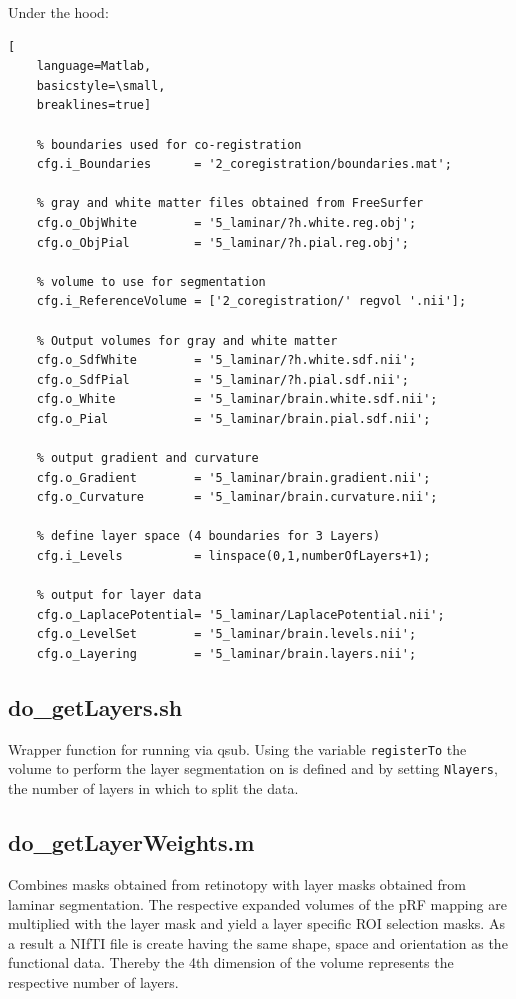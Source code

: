 \documentclass[12pt,a4paper]{scrartcl}
\begin{document}
\noindent Under the hood:
\begin{lstlisting}[
    language=Matlab,
    basicstyle=\small,
    breaklines=true]

    % boundaries used for co-registration
    cfg.i_Boundaries      = '2_coregistration/boundaries.mat';

    % gray and white matter files obtained from FreeSurfer
    cfg.o_ObjWhite        = '5_laminar/?h.white.reg.obj';
    cfg.o_ObjPial         = '5_laminar/?h.pial.reg.obj';

    % volume to use for segmentation
    cfg.i_ReferenceVolume = ['2_coregistration/' regvol '.nii'];

    % Output volumes for gray and white matter
    cfg.o_SdfWhite        = '5_laminar/?h.white.sdf.nii';
    cfg.o_SdfPial         = '5_laminar/?h.pial.sdf.nii';
    cfg.o_White           = '5_laminar/brain.white.sdf.nii';
    cfg.o_Pial            = '5_laminar/brain.pial.sdf.nii';

    % output gradient and curvature
    cfg.o_Gradient        = '5_laminar/brain.gradient.nii';
    cfg.o_Curvature       = '5_laminar/brain.curvature.nii';

    % define layer space (4 boundaries for 3 Layers)
    cfg.i_Levels          = linspace(0,1,numberOfLayers+1);

    % output for layer data
    cfg.o_LaplacePotential= '5_laminar/LaplacePotential.nii';
    cfg.o_LevelSet        = '5_laminar/brain.levels.nii';
    cfg.o_Layering        = '5_laminar/brain.layers.nii';
\end{lstlisting}

\subsection{do\_getLayers.sh}
\label{sh:getLyr}
Wrapper function for running \texttt{} via qsub. Using the variable \texttt{registerTo} the volume to perform the layer segmentation on is defined and by setting \texttt{Nlayers}, the number of layers in which to split the data.\\

\subsection{do\_getLayerWeights.m}
\label{m:getLyrW}
Combines masks obtained from retinotopy with layer masks obtained from laminar segmentation. The respective expanded volumes of the pRF mapping are multiplied with the layer mask and yield a layer specific ROI selection masks. As a result a NIfTI file is create having the same shape, space and orientation as the functional data. Thereby the 4th dimension of the volume represents the respective number of layers.\\
\end{document}
